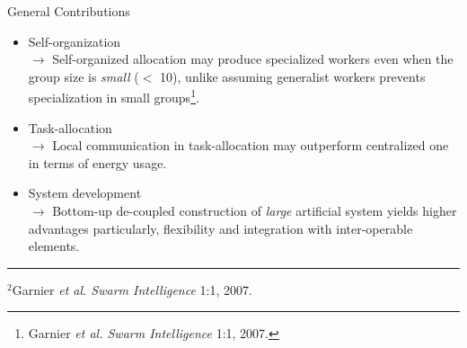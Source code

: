\documentclass{beamer}
\begin{document}
\begin{frame}[t]{General Contributions}
\begin{itemize}
    \item \normalsize \alert{Self-organization}\\ 
$\rightarrow$ \small Self-organized allocation may produce specialized workers even when the group size is \textit{small} ($<$ 10), unlike assuming generalist workers prevents specialization in small groups\footnote{\scriptsize Garnier \textit{et al. Swarm Intelligence} 1:1, 2007.}.
    \item \normalsize \alert{Task-allocation}\\
$\rightarrow$ \small  Local communication in task-allocation may outperform centralized one in terms of energy usage.
\item \normalsize \alert{System development}\\
$\rightarrow$ \small Bottom-up de-coupled construction of \textit{large} artificial system yields higher advantages particularly, flexibility and integration with inter-operable elements.%
\end{itemize}
%
\hrule
\scriptsize $^2$Garnier \textit{et al. Swarm Intelligence} 1:1, 2007.
\end{frame}	
\end{document}
